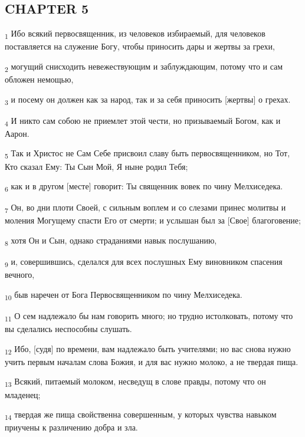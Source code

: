 \subsection{CHAPTER 5}
\begin{tcolorbox}
\textsubscript{1} Ибо всякий первосвященник, из человеков избираемый, для человеков поставляется на служение Богу, чтобы приносить дары и жертвы за грехи,
\end{tcolorbox}
\begin{tcolorbox}
\textsubscript{2} могущий снисходить невежествующим и заблуждающим, потому что и сам обложен немощью,
\end{tcolorbox}
\begin{tcolorbox}
\textsubscript{3} и посему он должен как за народ, так и за себя приносить [жертвы] о грехах.
\end{tcolorbox}
\begin{tcolorbox}
\textsubscript{4} И никто сам собою не приемлет этой чести, но призываемый Богом, как и Аарон.
\end{tcolorbox}
\begin{tcolorbox}
\textsubscript{5} Так и Христос не Сам Себе присвоил славу быть первосвященником, но Тот, Кто сказал Ему: Ты Сын Мой, Я ныне родил Тебя;
\end{tcolorbox}
\begin{tcolorbox}
\textsubscript{6} как и в другом [месте] говорит: Ты священник вовек по чину Мелхиседека.
\end{tcolorbox}
\begin{tcolorbox}
\textsubscript{7} Он, во дни плоти Своей, с сильным воплем и со слезами принес молитвы и моления Могущему спасти Его от смерти; и услышан был за [Свое] благоговение;
\end{tcolorbox}
\begin{tcolorbox}
\textsubscript{8} хотя Он и Сын, однако страданиями навык послушанию,
\end{tcolorbox}
\begin{tcolorbox}
\textsubscript{9} и, совершившись, сделался для всех послушных Ему виновником спасения вечного,
\end{tcolorbox}
\begin{tcolorbox}
\textsubscript{10} быв наречен от Бога Первосвященником по чину Мелхиседека.
\end{tcolorbox}
\begin{tcolorbox}
\textsubscript{11} О сем надлежало бы нам говорить много; но трудно истолковать, потому что вы сделались неспособны слушать.
\end{tcolorbox}
\begin{tcolorbox}
\textsubscript{12} Ибо, [судя] по времени, вам надлежало быть учителями; но вас снова нужно учить первым началам слова Божия, и для вас нужно молоко, а не твердая пища.
\end{tcolorbox}
\begin{tcolorbox}
\textsubscript{13} Всякий, питаемый молоком, несведущ в слове правды, потому что он младенец;
\end{tcolorbox}
\begin{tcolorbox}
\textsubscript{14} твердая же пища свойственна совершенным, у которых чувства навыком приучены к различению добра и зла.
\end{tcolorbox}
